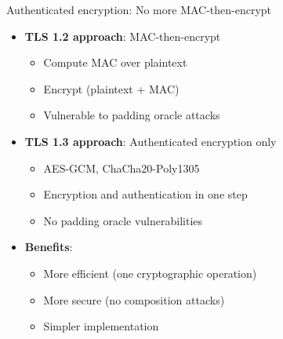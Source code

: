 \documentclass[aspectratio=169, lualatex, handout]{beamer}
\begin{document}
\begin{frame}{Authenticated encryption: No more MAC-then-encrypt}
	\begin{itemize}
		\item \textbf{TLS 1.2 approach}: MAC-then-encrypt
		      \begin{itemize}
			      \item Compute MAC over plaintext
			      \item Encrypt (plaintext + MAC)
			      \item Vulnerable to padding oracle attacks
		      \end{itemize}
		\item \textbf{TLS 1.3 approach}: Authenticated encryption only
		      \begin{itemize}
			      \item AES-GCM, ChaCha20-Poly1305
			      \item Encryption and authentication in one step
			      \item No padding oracle vulnerabilities
		      \end{itemize}
		\item \textbf{Benefits}:
		      \begin{itemize}
			      \item More efficient (one cryptographic operation)
			      \item More secure (no composition attacks)
			      \item Simpler implementation
		      \end{itemize}
	\end{itemize}
\end{frame}
\end{document}
